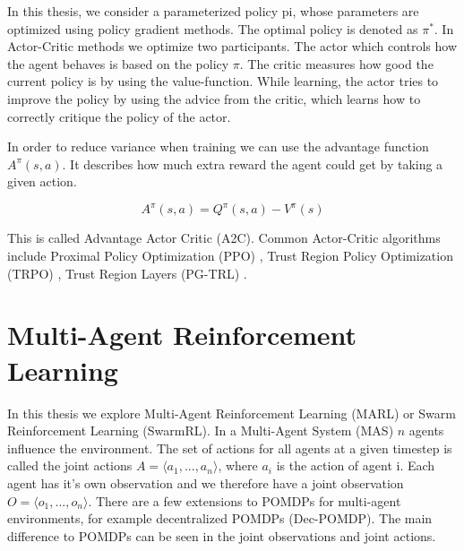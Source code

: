 In this thesis, we consider a parameterized policy pi, whose parameters are optimized using policy gradient methods. The optimal policy is denoted as $\pi^*$. In Actor-Critic methods we optimize two participants. The actor which controls how the agent behaves is based on the policy $\pi$. The critic measures how good the current policy is by using the value-function. While learning, the actor tries to improve the policy by using the advice from the critic, which learns how to correctly critique the policy of the actor. \par

In order to reduce variance when training we can use the advantage function $A^\pi(s,a)$. It describes how much extra reward the agent could get by taking a given action.

\begin{equation}
    A^\pi(s,a) = Q^\pi(s,a) - V^\pi(s)\nonumber
\end{equation} 

This is called Advantage Actor Critic (A2C). Common Actor-Critic algorithms include Proximal Policy Optimization (PPO) , Trust Region Policy Optimization (TRPO) , Trust Region Layers (PG-TRL) .



\section{Multi-Agent Reinforcement Learning}

In this thesis we explore Multi-Agent Reinforcement Learning (MARL) or Swarm Reinforcement Learning (SwarmRL). In a Multi-Agent System (MAS) $n$ agents influence the environment. The set of actions for all agents at a given timestep is called the joint actions $A = \langle a_1,...,a_n\rangle$, where $a_i$ is the action of agent i. Each agent has it's own observation and we therefore have a joint observation $O = \langle o_1,...,o_n\rangle$. There are a few extensions to POMDPs for multi-agent environments, for example decentralized POMDPs (Dec-POMDP). The main difference to POMDPs can be seen in the joint observations and joint actions.

